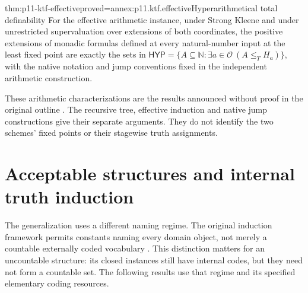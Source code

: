 \begin{hbtheorem}{thm:p11-ktf-effective}{proved=annex:p11.ktf.effective}{Hyperarithmetical total definability}
For the effective arithmetic instance, under Strong Kleene and under
unrestricted supervaluation over extensions of both coordinates, the
positive extensions of monadic formulas defined at every natural-number
input at the least fixed point are exactly the sets in
\(\mathsf{HYP}=\{A\subseteq\mathbb N:\exists a\in\mathcal O
\ (A\leq_T H_a)\}\), with the native notation and jump
conventions fixed in the independent arithmetic construction.
\end{hbtheorem}

These arithmetic characterizations are the results announced without
proof in the original outline \cite[pp.~715--716]{Kripke1975}.
The recursive tree, effective induction and native jump constructions
give their separate arguments. They do not identify the two schemes'
fixed points or their stagewise truth assignments.

\section{Acceptable structures and internal truth induction}

The generalization uses a different naming regime. The original
induction framework permits constants naming every domain object,
not merely a countable externally coded vocabulary
\cite[1B--1D, 5A--5B]{Moschovakis1974EIASOriginal}.
This distinction matters for an uncountable structure: its closed
instances still have internal codes, but they need not form a
countable set. The following results use that regime and its
specified elementary coding resources.

